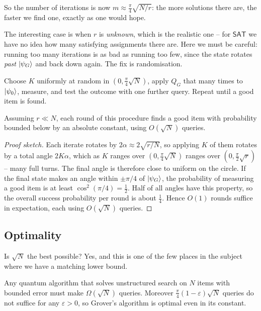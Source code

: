 \documentclass[a4paper]{scrartcl}
\begin{document}
So the number of iterations is now $m\approx\frac\pi4\sqrt{N/r}$: the more solutions there are, the faster we find one, exactly as one would hope.

The interesting case is when $r$ is \emph{unknown}, which is the realistic one -- for $\mathsf{SAT}$ we have no idea how many satisfying assignments there are. Here we must be careful: running too many iterations is as bad as running too few, since the state rotates \emph{past} $\ket{\psi_G}$ and back down again. The fix is randomisation.

\begin{method}
	Choose $K$ uniformly at random in $\left(0,\tfrac\pi4\sqrt N\right)$, apply $Q_G$ that many times to $\ket{\psi_0}$, measure, and test the outcome with one further query. Repeat until a good item is found.
\end{method}

\begin{proposition}
	Assuming $r\ll N$, each round of this procedure finds a good item with probability bounded below by an absolute constant, using $O(\sqrt N)$ queries.
\end{proposition}

\begin{proof}[Proof sketch]
	Each iterate rotates by $2\alpha\approx2\sqrt{r/N}$, so applying $K$ of them rotates by a total angle $2K\alpha$, which as $K$ ranges over $(0,\tfrac\pi4\sqrt N)$ ranges over $(0,\tfrac\pi2\sqrt r)$ -- many full turns. The final angle is therefore close to uniform on the circle. If the final state makes an angle within $\pm\pi/4$ of $\ket{\psi_G}$, the probability of measuring a good item is at least $\cos^2(\pi/4) = \tfrac12$. Half of all angles have this property, so the overall success probability per round is about $\tfrac14$. Hence $O(1)$ rounds suffice in expectation, each using $O(\sqrt N)$ queries.
\end{proof}

\subsection{Optimality}

Is $\sqrt N$ the best possible? Yes, and this is one of the few places in the subject where we have a matching lower bound.

\begin{theorem}[BBBV]
	Any quantum algorithm that solves unstructured search on $N$ items with bounded error must make $\Omega(\sqrt N)$ queries. Moreover $\frac\pi4(1-\varepsilon)\sqrt N$ queries do not suffice for any $\varepsilon>0$, so Grover's algorithm is optimal even in its constant.
\end{theorem}
\end{document}
